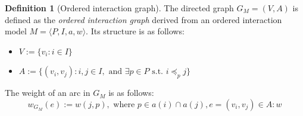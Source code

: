 \documentclass[a4paper,11pt]{book}
\theoremstyle{definition}
\newtheorem{definition}{Definition}
\begin{document}
\begin{definition}[Ordered interaction graph]
    The directed graph $G_M = (V, A)$ is defined as the \emph{ordered interaction graph}
    derived from an ordered interaction model $M =\langle P, I, a, w \rangle$.
    Its structure is as follows:
    \begin{itemize}
        \item $V := \{ v_{i} : i \in I\}$\\
        \item $A := \{ (v_{i}, v_{j}) : i, j \in I, \mbox{ and } \exists p\in P \mbox{ s.t. } i \preceq_p j \}$\\
    \end{itemize}

    The weight of an arc in $G_M$ is as follows:
    \begin{equation*}
        w_{G_M}(e) := w(j, p), \mbox{ where } p \in a(i) \cap a(j), e = (v_{i}, v_{j}) \in A:w
    \end{equation*}

    
    \label{def:oig}
\end{definition}
\end{document}
